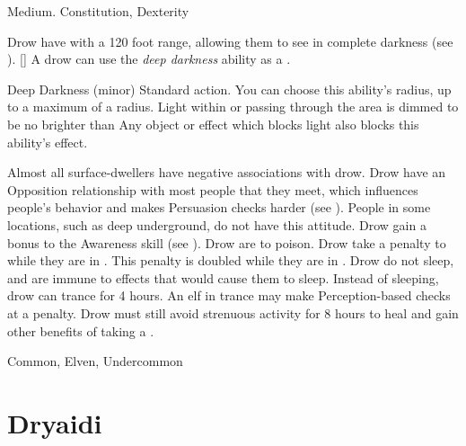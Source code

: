      Medium.
      Constitution,  Dexterity
    \begin{itemize}
         Drow have  with a 120 foot range, allowing them to see in complete darkness (see ).
        [\sparkle] A drow can use the \textit{deep darkness} ability as a .
            \begin{magicalsustainability}{Deep Darkness}{ (minor)}
                \abilityusagetime Standard action.
                \rankline
                You can choose this ability's radius, up to a maximum of a \areamed radius.
                Light within or passing through the area is dimmed to be no brighter than 
                Any object or effect which blocks light also blocks this ability's effect.
            \end{magicalsustainability}
         Almost all surface-dwellers have negative associations with drow.
            Drow have an Opposition relationship with most people that they meet, which influences people's behavior and makes Persuasion checks harder (see ).
            People in some locations, such as deep underground, do not have this attitude.
         Drow gain a  bonus to the Awareness skill (see ).
         Drow are  to poison.
         Drow take a  penalty to  while they are in .
            This penalty is doubled while they are in .
         Drow do not sleep, and are immune to \magical effects that would cause them to sleep.
            Instead of sleeping, drow can trance for 4 hours.
            An elf in trance may make Perception-based checks at a  penalty.
            Drow must still avoid strenuous activity for 8 hours to heal and gain other benefits of taking a .
    \end{itemize}
     Common, Elven, Undercommon

\section{Dryaidi}

